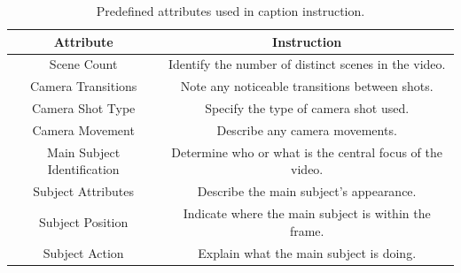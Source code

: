 
\begin{table}
    \centering
    \small
    \begin{tabular}{c|c}
    \toprule
    Attribute & Instruction  \\
    \midrule
    Scene Count & Identify the number of distinct scenes in the video. \\
    Camera Transitions & Note any noticeable transitions between shots. \\
    Camera Shot Type & Specify the type of camera shot used. \\ 
    Camera Movement & Describe any camera movements.  \\
    Main Subject Identification & Determine who or what is the central focus of the video. \\
    Subject Attributes & Describe the main subject's appearance. \\
    Subject Position & Indicate where the main subject is within the frame.  \\
    Subject Action  & Explain what the main subject is doing.  \\
    \bottomrule
    \end{tabular}
    \vspace{0.5em}
    \caption{Predefined attributes used in caption instruction.}
    \label{table:caption_attributes}
\end{table}

